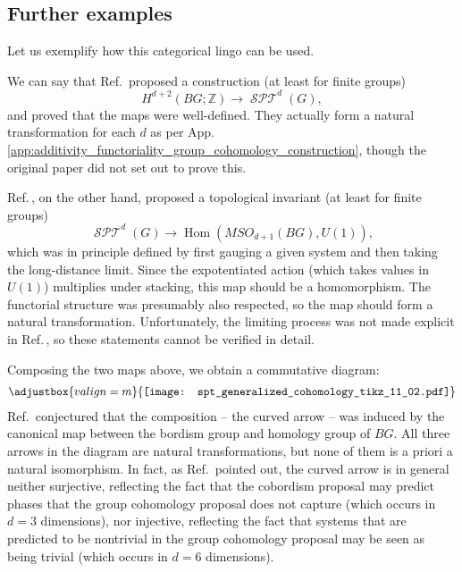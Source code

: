 \documentclass[sort&compress]{elsarticle}
\theoremstyle{theoremstyle}
\theoremstyle{framedtheoremstyle}
\theoremstyle{definitionstyle}
\theoremstyle{definitionstyle}
\theoremstyle{definitionstyle}
\theoremstyle{definitionstyle}
\theoremstyle{nameddefinitionstyle}
\theoremstyle{framednameddefinitionstyle}
\theoremstyle{proofstyle}
\theoremstyle{definitionstyle}
\newcommand{\fromto}{\rightarrow}
\newcommand{\ZZZ}{\mathbb{Z}}
\DeclareMathOperator{\Hom}{Hom}
\newcommand{\paren}[1]{\left( #1 \right)}
\newcommand{\SPT}{\operatorname{\mathcal{SPT}}}
\begin{document}
\begin{appendices}
\subsection{Further examples\label{subapp:further_examples}}

Let us exemplify how this categorical lingo can be used.

We can say that Ref.\,\cite{Wen_Boson} proposed a construction (at least for finite groups)
\begin{equation}
H^{d+2}\paren{BG;\ZZZ} \fromto \SPT^d\paren{G}, \label{further_examples_Borel_group_cohomology_construction}
\end{equation}
and proved that the maps were well-defined. They actually form a natural transformation for each $d$ as per App.\,\ref{app:additivity_functoriality_group_cohomology_construction}, though the original paper did not set out to prove this.

Ref.\,\cite{Kapustin_Boson}, on the other hand, proposed a topological invariant (at least for finite groups)
\begin{equation}
\SPT^d(G) \fromto \Hom\paren{MSO_{d+1}(BG), U(1)},
\end{equation}
which was in principle defined by first gauging a given system and then taking the long-distance limit. Since the expotentiated action (which takes values in $U(1)$) multiplies under stacking, this map should be a homomorphism. The functorial structure was presumably also respected, so the map should form a natural transformation. Unfortunately, the limiting process was not made explicit in Ref.\,\cite{Kapustin_Boson}, so these statements cannot be verified in detail.

Composing the two maps above, we obtain a commutative diagram:
\begin{eqnarray}
\adjustbox{valign=m}{\texttt{[image: spt\_generalized\_cohomology\_tikz\_11\_02.pdf]}}
\end{eqnarray}
Ref.\,\cite{Kapustin_Boson} conjectured that the composition -- the curved arrow -- was induced by the canonical map between the bordism group and homology group of $BG$. All three arrows in the diagram are natural transformations, but none of them is a priori a natural isomorphism. In fact, as Ref.\,\cite{Kapustin_Boson} pointed out, the curved arrow is in general neither surjective, reflecting the fact that the cobordism proposal may predict phases that the group cohomology proposal does not capture (which occurs in $d=3$ dimensions), nor injective, reflecting the fact that systems that are predicted to be nontrivial in the group cohomology proposal may be seen as being trivial (which occurs in $d=6$ dimensions).


\end{appendices}
\end{document}
